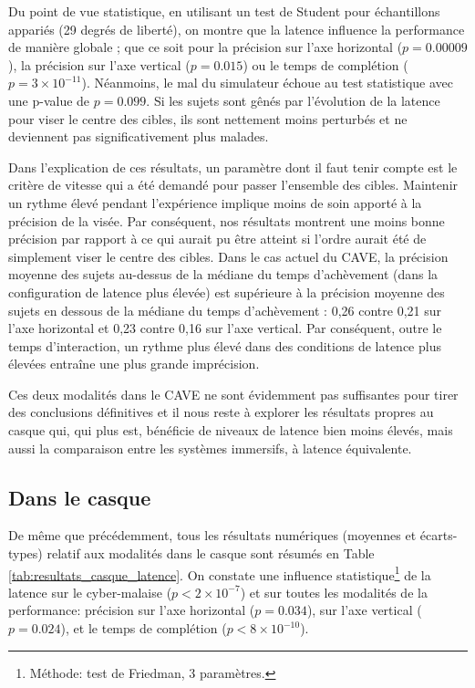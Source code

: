 	\par Du point de vue statistique, en utilisant un test de Student pour échantillons appariés (29 degrés de liberté), on montre que la latence influence la performance de manière globale ; que ce soit pour la précision sur l'axe horizontal ($p = 0.00009$), la précision sur l'axe vertical ($p = 0.015$) ou le temps de complétion ($p = 3 \times 10^{-11}$). Néanmoins, le mal du simulateur échoue au test statistique avec une p-value de $p = 0.099$. Si les sujets sont gênés par l'évolution de la latence pour viser le centre des cibles, ils sont nettement moins perturbés et ne deviennent pas significativement plus malades.
	
	\par Dans l'explication de ces résultats, un paramètre dont il faut tenir compte est le critère de vitesse qui a été demandé pour passer l'ensemble des cibles. Maintenir un rythme élevé pendant l'expérience implique moins de soin apporté à la précision de la visée. Par conséquent, nos résultats montrent une moins bonne précision par rapport à ce qui aurait pu être atteint si l'ordre aurait été de simplement viser le centre des cibles. Dans le cas actuel du CAVE, la précision moyenne des sujets au-dessus de la médiane du temps d'achèvement (dans la configuration de latence plus élevée) est supérieure à la précision moyenne des sujets en dessous de la médiane du temps d'achèvement : 0,26 contre 0,21 sur l'axe horizontal et 0,23 contre 0,16 sur l'axe vertical. Par conséquent, outre le temps d'interaction, un rythme plus élevé dans des conditions de latence plus élevées entraîne une plus grande imprécision. 

	\par Ces deux modalités dans le CAVE ne sont évidemment pas suffisantes pour tirer des conclusions définitives et il nous reste à explorer les résultats propres au casque qui, qui plus est, bénéficie de niveaux de latence bien moins élevés, mais aussi la comparaison entre les systèmes immersifs, à latence équivalente.
	
	\subsection{Dans le casque}
	\par De même que précédemment, tous les résultats numériques (moyennes et écarts-types) relatif aux modalités dans le casque sont résumés en Table \ref{tab:resultats_casque_latence}. On constate une influence statistique\footnote{Méthode: test de Friedman, 3 paramètres.} de la latence sur le cyber-malaise ($p < 2 \times 10^{-7}$) et sur toutes les modalités de la performance: précision sur l'axe horizontal ($p = 0.034$), sur l'axe vertical ($p = 0.024$), et le temps de complétion ($p < 8 \times 10^{-10}$).
	
